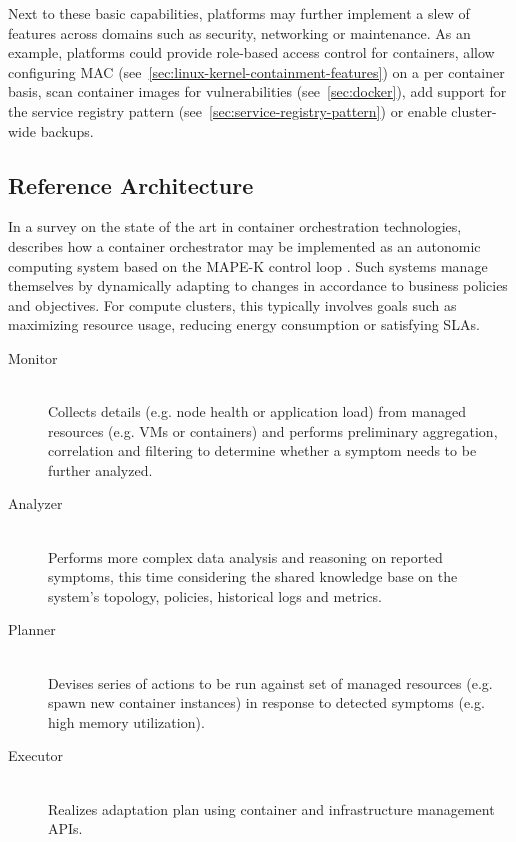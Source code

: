 Next to these basic capabilities, platforms may further implement a slew of features across domains such as security, networking or maintenance. As an example, platforms could provide role-based access control for containers, allow configuring \acl{MAC} (see~\autoref{sec:linux-kernel-containment-features}) on a per container basis, scan container images for vulnerabilities (see~\autoref{sec:docker}), add support for the service registry pattern (see~\autoref{sec:service-registry-pattern}) or enable cluster-wide backups.


\subsection{Reference Architecture}
\label{sec:orchestration-reference-architecture}

In a survey on the state of the art in container orchestration technologies, \citeauthor{casalicchio2019container} describes how a container orchestrator may be implemented as an autonomic computing system based on the \acs{MAPE-K} control loop \cite[pp.~226-228]{casalicchio2019container}. Such systems manage themselves by dynamically adapting to changes in accordance to business policies and objectives. For compute clusters, this typically involves goals such as maximizing resource usage, reducing energy consumption or satisfying \acsp{SLA}.

\begin{description}
  \item[Monitor]
  \hfill \\
  Collects details (e.g. node health or application load) from managed resources (e.g. \acsp{VM} or containers) and performs preliminary aggregation, correlation and filtering to determine whether a symptom needs to be further analyzed.

  \item[Analyzer]
  \hfill \\
  Performs more complex data analysis and reasoning on reported symptoms, this time considering the shared knowledge base on the system's topology, policies, historical logs and metrics.

  \item[Planner]
  \hfill \\
  Devises series of actions to be run against set of managed resources (e.g. spawn new container instances) in response to detected symptoms (e.g. high memory utilization).

  \item[Executor]
  \hfill \\
  Realizes adaptation plan using container and infrastructure management \acsp{API}.
\end{description}


